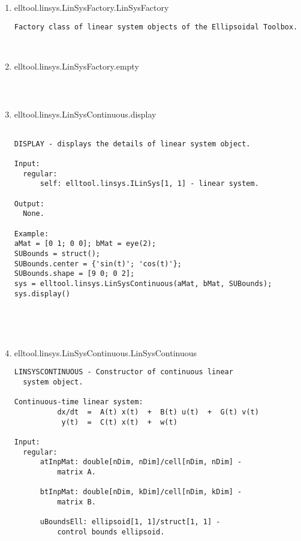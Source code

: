 \begin{enumerate}
\begin{lstlisting}
\end{lstlisting}
\fontfamily{\familydefault}
\selectfont
\item {elltool.linsys.LinSysFactory.LinSysFactory}
\selectfont
\begin{lstlisting}
Factory class of linear system objects of the Ellipsoidal Toolbox.



\end{lstlisting}
\fontfamily{\familydefault}
\selectfont
\item {elltool.linsys.LinSysFactory.empty}
\selectfont
\begin{lstlisting}



\end{lstlisting}
\fontfamily{\familydefault}
\selectfont
\item {elltool.linsys.LinSysContinuous.display}
\selectfont
\begin{lstlisting}

DISPLAY - displays the details of linear system object.

Input:
  regular:
      self: elltool.linsys.ILinSys[1, 1] - linear system.

Output:
  None.

Example:
aMat = [0 1; 0 0]; bMat = eye(2);
SUBounds = struct();
SUBounds.center = {'sin(t)'; 'cos(t)'};
SUBounds.shape = [9 0; 0 2];
sys = elltool.linsys.LinSysContinuous(aMat, bMat, SUBounds);
sys.display()





\end{lstlisting}
\fontfamily{\familydefault}
\selectfont
\item {elltool.linsys.LinSysContinuous.LinSysContinuous}
\selectfont
\begin{lstlisting}
LINSYSCONTINUOUS - Constructor of continuous linear
  system object.

Continuous-time linear system:
          dx/dt  =  A(t) x(t)  +  B(t) u(t)  +  G(t) v(t)
           y(t)  =  C(t) x(t)  +  w(t)

Input:
  regular:
      atInpMat: double[nDim, nDim]/cell[nDim, nDim] -
          matrix A.

      btInpMat: double[nDim, kDim]/cell[nDim, kDim] -
          matrix B.

      uBoundsEll: ellipsoid[1, 1]/struct[1, 1] -
          control bounds ellipsoid.


\end{lstlisting}
\end{enumerate}
